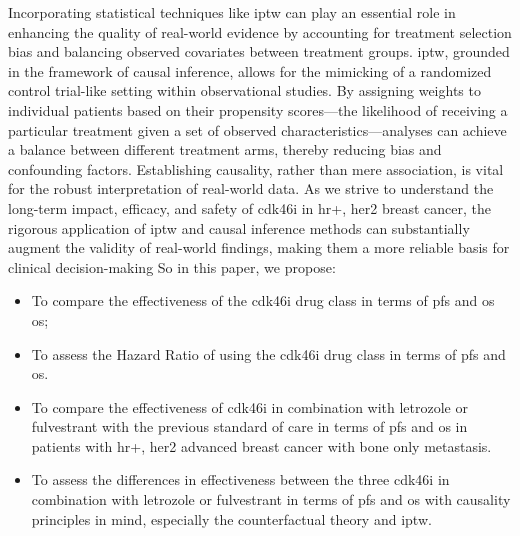 Incorporating statistical techniques like \ac{iptw} can play an essential role in enhancing the quality of real-world evidence by accounting for treatment selection bias and balancing observed covariates between treatment groups. \ac{iptw}, grounded in the framework of causal inference, allows for the mimicking of a randomized control trial-like setting within observational studies. By assigning weights to individual patients based on their propensity scores—the likelihood of receiving a particular treatment given a set of observed characteristics—analyses can achieve a balance between different treatment arms, thereby reducing bias and confounding factors. Establishing causality, rather than mere association, is vital for the robust interpretation of real-world data. As we strive to understand the long-term impact, efficacy, and safety of \ac{cdk46i} in \ac{hr+}, \ac{her2} breast cancer, the rigorous application of \ac{iptw} and causal inference methods can substantially augment the validity of real-world findings, making them a more reliable basis for clinical decision-making \cite{austinIntroductionPropensityScore2011,austinUsePropensityScore2014}
So in this paper, we propose:
\begin{itemize}
    \item To compare the effectiveness of the \ac{cdk46i} drug class in terms of  \ac{pfs}  and \ac{os} \ac{os};

    \item To assess the Hazard Ratio of using the \ac{cdk46i} drug class in terms of \ac{pfs} and \ac{os}.
    
    \item  To compare the effectiveness of \ac{cdk46i} in combination with letrozole or fulvestrant with the previous standard of care in terms of \ac{pfs} and \ac{os} in patients with \ac{hr+}, \ac{her2} advanced breast cancer with bone only metastasis.

    \item To assess the differences in effectiveness between the three \ac{cdk46i} in combination with letrozole or fulvestrant in terms of \ac{pfs} and \ac{os} with causality principles in mind, especially the counterfactual theory and \ac{iptw}.
    
\end{itemize}
